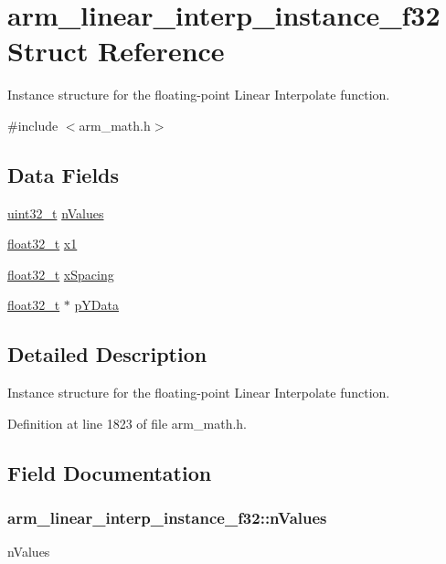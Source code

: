 \hypertarget{structarm__linear__interp__instance__f32}{\section{arm\-\_\-linear\-\_\-interp\-\_\-instance\-\_\-f32 Struct Reference}
\label{structarm__linear__interp__instance__f32}
}


Instance structure for the floating-\/point Linear Interpolate function.  




{\ttfamily \#include $<$arm\-\_\-math.\-h$>$}

\subsection*{Data Fields}
\begin{DoxyCompactItemize}
\item 
\hyperlink{stdint_8h_a435d1572bf3f880d55459d9805097f62}{uint32\-\_\-t} \hyperlink{structarm__linear__interp__instance__f32_a95f02a926b16d35359aca5b31e813b11}{n\-Values}
\item 
\hyperlink{arm__math_8h_a4611b605e45ab401f02cab15c5e38715}{float32\-\_\-t} \hyperlink{structarm__linear__interp__instance__f32_a08352dc6ea82fbc0827408e018535481}{x1}
\item 
\hyperlink{arm__math_8h_a4611b605e45ab401f02cab15c5e38715}{float32\-\_\-t} \hyperlink{structarm__linear__interp__instance__f32_aa8e2d686b5434a406d390b347b183511}{x\-Spacing}
\item 
\hyperlink{arm__math_8h_a4611b605e45ab401f02cab15c5e38715}{float32\-\_\-t} $\ast$ \hyperlink{structarm__linear__interp__instance__f32_ab373001f6afad0850359c344a4d7eee4}{p\-Y\-Data}
\end{DoxyCompactItemize}


\subsection{Detailed Description}
Instance structure for the floating-\/point Linear Interpolate function. 

Definition at line 1823 of file arm\-\_\-math.\-h.



\subsection{Field Documentation}
\hypertarget{structarm__linear__interp__instance__f32_a95f02a926b16d35359aca5b31e813b11}{
\subsubsection[{n\-Values}]{ arm\-\_\-linear\-\_\-interp\-\_\-instance\-\_\-f32\-::n\-Values}}\label{structarm__linear__interp__instance__f32_a95f02a926b16d35359aca5b31e813b11}
n\-Values 

